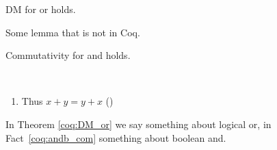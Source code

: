 \documentclass{llncs}
\begin{document}
\begin{theorem}[][DM_or]
  DM for or holds.
\end{theorem}

\begin{lemma}
  Some lemma that is not in Coq.
\end{lemma}

\begin{fact}
  Commutativity for and holds.
\end{fact}

\begin{fact}~
  \begin{enumerate}
  \coqitem[plus_O] $x + 0 = x$
  \coqitem[plus_S] $x + S y = S (x + y)$
  \item Thus $x + y = y + x$ ()
\end{enumerate}
\end{fact}

In Theorem \ref{coq:DM_or} we say something about logical or, in
Fact~\ref{coq:andb_com} something about boolean and.
\end{document}

